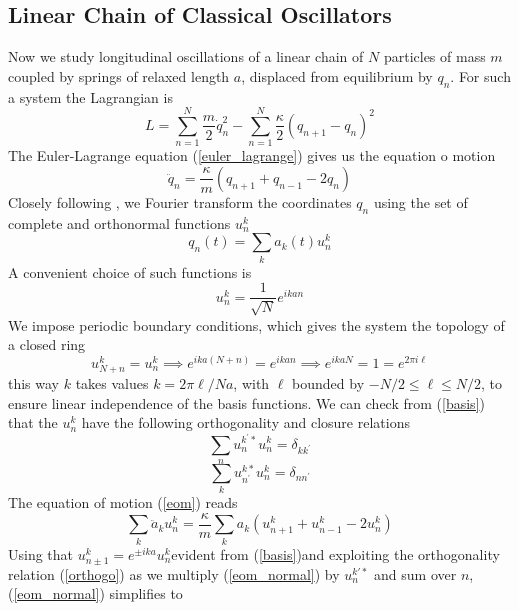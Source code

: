 \subsection{Linear Chain of Classical Oscillators}
Now we study longitudinal oscillations of a linear chain of $N$ particles of mass $m$ coupled by springs of relaxed length $a$, displaced from equilibrium by $q_n$.
For such a system the Lagrangian is
\begin{equation}
   L=\sum_{n=1}^N\frac{m}{2}\dot{q}^2_n - \sum_{n=1}^N\frac{\kappa}{2}(q_{n+1}-q_n)^2
\end{equation}
The Euler-Lagrange equation (\ref{euler_lagrange}) gives us the equation o motion
\begin{equation}
    \ddot{q}_n=\frac{\kappa}{m}(q_{n+1}+q_{n-1}-2q_n)
    \label{eom}
\end{equation}
Closely following \cite{greiner1996}, we Fourier transform the coordinates $q_n$ using the set of complete and orthonormal functions $u_n^k$
\begin{equation}
    q_n(t)=\sum_k a_k(t)u_n^k
    \label{qt}
\end{equation}
A convenient choice of such functions is 
\begin{equation}
    u_n^k=\frac{1}{\sqrt{N}}{e}^{{i}kan}
    \label{basis}
\end{equation}
We impose periodic boundary conditions, which gives the system the topology of a closed ring
\begin{equation}
    u_{N+n}^k=u_n^k\implies {e}^{{i}ka(N+n)}={e}^{{i}kan}\implies {e}^{{i}kaN}=1={e}^{2\pi {i}\ell}
\end{equation}
this way $k$ takes values $k=2\pi\ell/{Na}$, with $\ell$ bounded by $-{N}/{2}\leq \ell \leq {N}/{2}$, to ensure linear independence of the basis functions.
We can check from (\ref{basis})  that the $u_n^k$ have the following orthogonality and closure relations 
\begin{equation}
    \sum_n u_n^{k^\prime *}u_n^k=\delta_{k k^\prime}
    \label{orthogo}
\end{equation}
\begin{equation}
    \sum_k u_{n^\prime}^{k *}u_n^k=\delta_{n n^\prime}
    \label{closure}
\end{equation}
The equation of motion (\ref{eom}) reads
\begin{equation}
    \sum_k\ddot{a}_ku_n^k=\frac{\kappa}{m}\sum_ka_k(u_{n+1}^k+u_{n-1}^k-2u_n^k)
    \label{eom_normal}
\end{equation}
Using that $u^k_{n\pm1}=e^{\pm ika}u_n^k$\textemdash evident from (\ref{basis})\textemdash and exploiting the orthogonality relation (\ref{orthogo}) as we multiply (\ref{eom_normal}) by $u_n^{k'*}$ and sum over $n$, (\ref{eom_normal}) simplifies to
